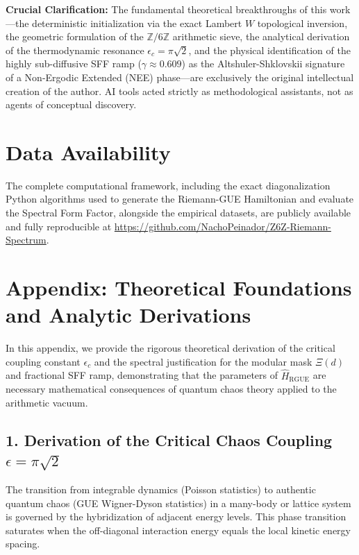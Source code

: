 \documentclass[aps,prl,preprint,superscriptaddress,floatfix]{revtex4-2}
\begin{document}
\begin{acknowledgments}
\textbf{Crucial Clarification:} The fundamental theoretical breakthroughs of this work—the deterministic initialization via the exact Lambert $W$ topological inversion, the geometric formulation of the $\mathbb{Z}/6\mathbb{Z}$ arithmetic sieve, the analytical derivation of the thermodynamic resonance $\epsilon_c = \pi\sqrt{2}$, and the physical identification of the highly sub-diffusive SFF ramp ($\gamma \approx 0.609$) as the Altshuler-Shklovskii signature of a Non-Ergodic Extended (NEE) phase—are exclusively the original intellectual creation of the author. AI tools acted strictly as methodological assistants, not as agents of conceptual discovery.
\end{acknowledgments}

\section{Data Availability}
The complete computational framework, including the exact diagonalization Python algorithms used to generate the Riemann-GUE Hamiltonian and evaluate the Spectral Form Factor, alongside the empirical datasets, are publicly available and fully reproducible at \url{https://github.com/NachoPeinador/Z6Z-Riemann-Spectrum}.

\appendix

\section{Appendix: Theoretical Foundations and Analytic Derivations}
\label{app:theory}

In this appendix, we provide the rigorous theoretical derivation of the critical coupling constant $\epsilon_c$ and the spectral justification for the modular mask $\Xi(d)$ and fractional SFF ramp, demonstrating that the parameters of $\hat{H}_{\text{RGUE}}$ are necessary mathematical consequences of quantum chaos theory applied to the arithmetic vacuum.

\subsection{1. Derivation of the Critical Chaos Coupling \texorpdfstring{$\epsilon = \pi\sqrt{2}$}{epsilon}}
The transition from integrable dynamics (Poisson statistics) to authentic quantum chaos (GUE Wigner-Dyson statistics) in a many-body or lattice system is governed by the hybridization of adjacent energy levels. This phase transition saturates when the off-diagonal interaction energy equals the local kinetic energy spacing.
\end{document}
